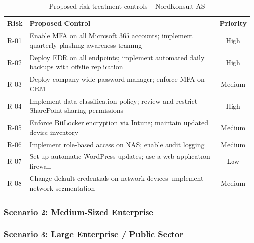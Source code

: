 \begin{table}[ht]
\centering
\caption{Proposed risk treatment controls -- NordKonsult AS}
\label{tab:nordkonsult-controls}
\small
\begin{tabular}{lp{7.5cm}c}
\hline
\textbf{Risk} & \textbf{Proposed Control} & \textbf{Priority} \\
\hline
R-01 & Enable MFA on all Microsoft 365 accounts; implement quarterly phishing awareness training & High \\
R-02 & Deploy EDR on all endpoints; implement automated daily backups with offsite replication & High \\
R-03 & Deploy company-wide password manager; enforce MFA on CRM & Medium \\
R-04 & Implement data classification policy; review and restrict SharePoint sharing permissions & High \\
R-05 & Enforce BitLocker encryption via Intune; maintain updated device inventory & Medium \\
R-06 & Implement role-based access on NAS; enable audit logging & Medium \\
R-07 & Set up automatic WordPress updates; use a web application firewall & Low \\
R-08 & Change default credentials on network devices; implement network segmentation & Medium \\
\hline
\end{tabular}
\end{table}
 
\subsubsection{Scenario 2: Medium-Sized Enterprise}
\label{sec:scenario-medium}
 
\subsubsection{Scenario 3: Large Enterprise / Public Sector}
\label{sec:scenario-large}

